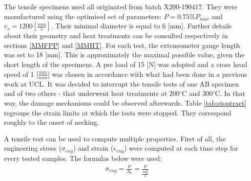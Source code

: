 The tensile specimens used all originated from batch X200-190417. They were manufactured using the optimised set of parameters: $P=0.75\% P_{max}$ and $v_s=1200 [\frac{mm}{s}]$. Their minimal diameter is equal to 6 [mm]. Further details about their geometry and heat treatments can be consulted respectively in sections \ref{MMFPP} and \ref{MMHT}. For each test, the extensometer gauge length was set to 18 [mm]. This is approximately the maximal possible value, given the short length of the specimens. A pre load of 15 [N] was adopted and a cross head speed of 1 [$\frac{mm}{min}$] was chosen in accordance with what had been done in a previous work at UCL. It was decided to interrupt the tensile tests of one AB specimen and of two others - that underwent heat treatments at 200$^\circ$C and 300$^\circ$C. In that way, the damage mechanisms could be observed afterwards. Table \ref{tab:stoptract} regroups the strain limits at which the tests were stopped. They correspond roughly to the onset of necking.\\

 \begin{center}
\begin{table}[ht]
\noindent{}

\caption[Strain limits for interrupted tensile tests of batch X200-180417 specimens]{Strain limits for interrupted tensile tests of batch X200-180417 specimens}
\label{tab:stoptract}
\end{table}
 \end{center}

A tensile test can be used to compute multiple properties. First of all,  the engineering stress ($\sigma_{eng}$) and strain  ($\epsilon_{eng}$) were computed at each time step for every tested samples. The formulas below were used:\\

\begin{align*}
\sigma_{eng}=\frac{F}{A_0}=\frac{F}{\frac{\pi d_0^2}{4}}
\end{align*}

